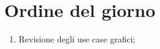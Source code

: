 \section{Ordine del giorno}

\begin{enumerate}
    \item Revisione degli use case grafici;
\end{enumerate}